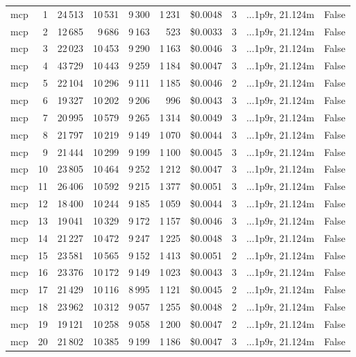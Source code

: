 \documentclass[a4paper,11pt]{article}
\begin{document}
\begin{table}[H]
{\begin{tabular}{l r r r r r r r l r}
\midrule
mcp & 1 & 24\,513 & 10\,531 & 9\,300 & 1\,231 & \$0.0048 & 3 & ...1p9r, 21.124m & False \\
mcp & 2 & 12\,685 & 9\,686 & 9\,163 & 523 & \$0.0033 & 3 & ...1p9r, 21.124m & False \\
mcp & 3 & 22\,023 & 10\,453 & 9\,290 & 1\,163 & \$0.0046 & 3 & ...1p9r, 21.124m & False \\
mcp & 4 & 43\,729 & 10\,443 & 9\,259 & 1\,184 & \$0.0047 & 3 & ...1p9r, 21.124m & False \\
mcp & 5 & 22\,104 & 10\,296 & 9\,111 & 1\,185 & \$0.0046 & 2 & ...1p9r, 21.124m & False \\
mcp & 6 & 19\,327 & 10\,202 & 9\,206 & 996 & \$0.0043 & 3 & ...1p9r, 21.124m & False \\
mcp & 7 & 20\,995 & 10\,579 & 9\,265 & 1\,314 & \$0.0049 & 3 & ...1p9r, 21.124m & False \\
mcp & 8 & 21\,797 & 10\,219 & 9\,149 & 1\,070 & \$0.0044 & 3 & ...1p9r, 21.124m & False \\
mcp & 9 & 21\,444 & 10\,299 & 9\,199 & 1\,100 & \$0.0045 & 3 & ...1p9r, 21.124m & False \\
mcp & 10 & 23\,805 & 10\,464 & 9\,252 & 1\,212 & \$0.0047 & 3 & ...1p9r, 21.124m & False \\
mcp & 11 & 26\,406 & 10\,592 & 9\,215 & 1\,377 & \$0.0051 & 3 & ...1p9r, 21.124m & False \\
mcp & 12 & 18\,400 & 10\,244 & 9\,185 & 1\,059 & \$0.0044 & 3 & ...1p9r, 21.124m & False \\
mcp & 13 & 19\,041 & 10\,329 & 9\,172 & 1\,157 & \$0.0046 & 3 & ...1p9r, 21.124m & False \\
mcp & 14 & 21\,227 & 10\,472 & 9\,247 & 1\,225 & \$0.0048 & 3 & ...1p9r, 21.124m & False \\
mcp & 15 & 23\,581 & 10\,565 & 9\,152 & 1\,413 & \$0.0051 & 2 & ...1p9r, 21.124m & False \\
mcp & 16 & 23\,376 & 10\,172 & 9\,149 & 1\,023 & \$0.0043 & 3 & ...1p9r, 21.124m & False \\
mcp & 17 & 21\,429 & 10\,116 & 8\,995 & 1\,121 & \$0.0045 & 2 & ...1p9r, 21.124m & False \\
mcp & 18 & 23\,962 & 10\,312 & 9\,057 & 1\,255 & \$0.0048 & 2 & ...1p9r, 21.124m & False \\
mcp & 19 & 19\,121 & 10\,258 & 9\,058 & 1\,200 & \$0.0047 & 2 & ...1p9r, 21.124m & False \\
mcp & 20 & 21\,802 & 10\,385 & 9\,199 & 1\,186 & \$0.0047 & 3 & ...1p9r, 21.124m & False \\

\end{tabular}}
\end{table}
\end{document}
